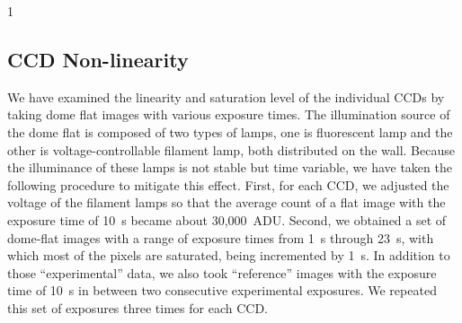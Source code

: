 \documentclass[a4paper,12pt]{spieman}  %
\begin{document}
\begin{spacing}{1}
\subsection{CCD Non-linearity}
\label{subsec:nonlinearity}

We have examined the linearity and saturation level of the individual CCDs
by taking dome flat images with various exposure times.
The illumination source of the dome flat is composed of two types of lamps,
one is fluorescent lamp and the other is voltage-controllable filament lamp,
both distributed on the wall.
Because the illuminance of these lamps is not stable but time variable,
we have taken the following procedure to mitigate this effect.
First, for each CCD, we adjusted the voltage of the filament lamps so that
the average count of a flat image with the exposure time of 10~s became about 30,000~ADU.
Second, we obtained a set of dome-flat images with a range of exposure times
from 1~s through 23~s, with which most of the pixels are saturated, being incremented by 1~s.
In addition to those ``experimental'' data, we also took ``reference'' images with
the exposure time of 10~s in between two consecutive experimental exposures.
We repeated this set of exposures three times for each CCD.


\end{spacing}
\end{document}
